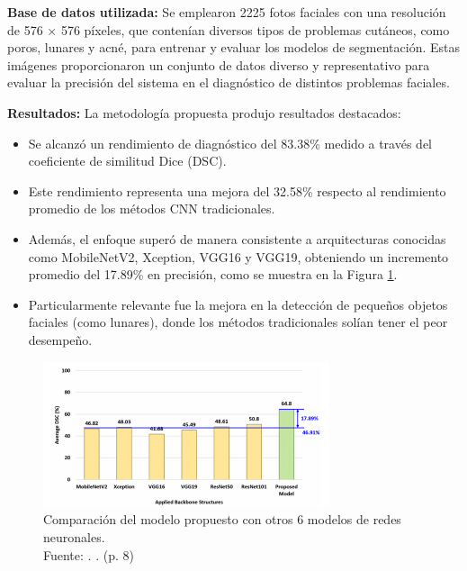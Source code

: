 \textbf{Base de datos utilizada:}
Se emplearon 2225 fotos faciales con una resolución de 576 × 576 píxeles, que contenían diversos tipos de problemas cutáneos, como poros, lunares y acné, para entrenar y evaluar los modelos de segmentación. Estas imágenes proporcionaron un conjunto de datos diverso y representativo para evaluar la precisión del sistema en el diagnóstico de distintos problemas faciales.

\textbf{Resultados:}
La metodología propuesta produjo resultados destacados:

\begin{itemize}
    \item Se alcanzó un rendimiento de diagnóstico del 83.38\% medido a través del coeficiente de similitud Dice (DSC).
    \item Este rendimiento representa una mejora del 32.58\% respecto al rendimiento promedio de los métodos CNN tradicionales.
    \item Además, el enfoque superó de manera consistente a arquitecturas conocidas como MobileNetV2, Xception, VGG16 y VGG19, obteniendo un incremento promedio del 17.89\% en precisión, como se muestra en la Figura \ref{2:fig2}.
    \item Particularmente relevante fue la mejora en la detección de pequeños objetos faciales (como lunares), donde los métodos tradicionales solían tener el peor desempeño.
\end{itemize}

\begin{figure}[H]
	\begin{center}
		\includegraphics[width=0.75\textwidth]{2/figures/resultados de cuarto anteedente.png}
		\caption[Comparación del modelo propuesto con otros 6 modelos de redes neuronales]{Comparación del modelo propuesto con otros 6 modelos de redes neuronales.\\
			Fuente: \cite{Kim2023}. . (p. 8)}
		\label{2:fig2}
	\end{center}
\end{figure}

